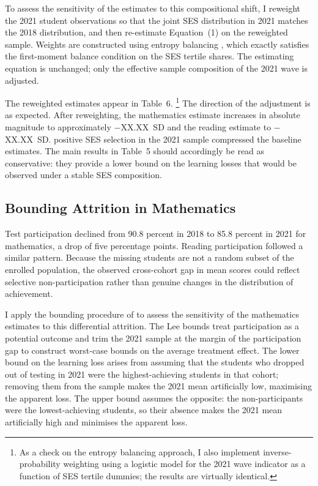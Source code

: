 To assess the sensitivity of the estimates to this compositional shift, I
reweight the 2021 student observations so that the joint SES distribution
in 2021 matches the 2018 distribution, and then re-estimate Equation~(1)
on the reweighted sample. Weights are constructed using entropy balancing
\citep{hainmueller2012entropy}, which exactly satisfies the first-moment
balance condition on the SES tertile shares. The estimating equation
is unchanged; only the effective sample composition of the 2021 wave
is adjusted.

The reweighted estimates appear in Table~6.%
\footnote{As a check on the entropy balancing approach, I also implement
inverse-probability weighting using a logistic model for the 2021
wave indicator as a function of SES tertile dummies; the results are
virtually identical.}
The direction of the adjustment is as expected. After reweighting, the
mathematics estimate increases in absolute magnitude to approximately
$-$XX.XX~SD and the reading estimate to %
$-$XX.XX~SD. %
positive SES selection in the 2021 sample compressed the baseline
estimates. The main results in Table~5 should accordingly be read as
conservative: they provide a lower bound on the learning losses that
would be observed under a stable SES composition.

\subsection{Bounding Attrition in Mathematics}
\label{subsec:lee}

Test participation declined from 90.8 percent in 2018 to 85.8 percent
in 2021 for mathematics, a drop of five percentage points. Reading
participation followed a similar pattern. Because the missing students
are not a random subset of the enrolled population, the observed
cross-cohort gap in mean scores could reflect selective non-participation
rather than genuine changes in the distribution of achievement.

I apply the bounding procedure of \citet{lee2009training} to assess the
sensitivity of the mathematics estimates to this differential attrition.
The Lee bounds treat participation as a potential outcome and trim the
2021 sample at the margin of the participation gap to construct
worst-case bounds on the average treatment effect. The lower bound on
the learning loss arises from assuming that the students who dropped
out of testing in 2021 were the highest-achieving students in that
cohort; removing them from the sample makes the 2021 mean artificially
low, maximising the apparent loss. The upper bound assumes the opposite:
the non-participants were the lowest-achieving students, so their
absence makes the 2021 mean artificially high and minimises the
apparent loss.

